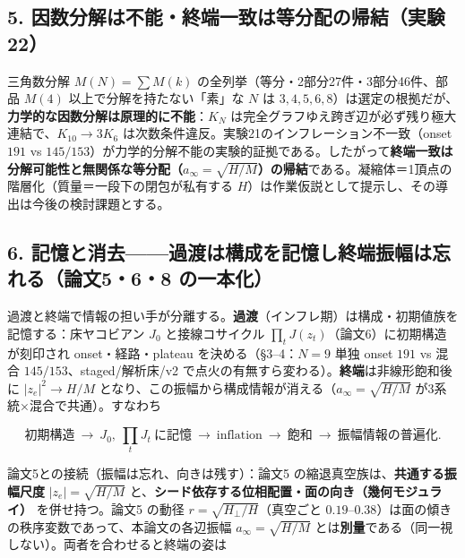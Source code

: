 \documentclass[
  a4paper,
]{ltjsarticle}
\begin{document}
\subsection{5.
因数分解は不能・終端一致は等分配の帰結（実験22）}\label{ux56e0ux6570ux5206ux89e3ux306fux4e0dux80fdux7d42ux7aefux4e00ux81f4ux306fux7b49ux5206ux914dux306eux5e30ux7d50ux5b9fux9a1322}

三角数分解 \(M(N)=\sum M(k)\) の全列挙（等分・2部分27件・3部分46件、部品
\(M(4)\) 以上で分解を持たない「素」な \(N\) は
\(3,4,5,6,8\)）は選定の根拠だが、\textbf{力学的な因数分解は原理的に不能}：\(K_N\)
は完全グラフゆえ跨ぎ辺が必ず残り極大連結で、\(K_{10}\to3K_6\)
は次数条件違反。実験21のインフレーション不一致（onset \(191\) vs
\(145/153\)）が力学的分解不能の実験的証拠である。したがって\textbf{終端一致は分解可能性と無関係な等分配（\(a_\infty=\sqrt{H/M}\)）の帰結}である。凝縮体＝1頂点の階層化（質量＝一段下の閉包が私有する
\(H\)）は作業仮説として提示し、その導出は今後の検討課題とする。

\subsection{6.
記憶と消去------過渡は構成を記憶し終端振幅は忘れる（論文5・6・8
の一本化）}\label{ux8a18ux61b6ux3068ux6d88ux53bbux904eux6e21ux306fux69cbux6210ux3092ux8a18ux61b6ux3057ux7d42ux7aefux632fux5e45ux306fux5fd8ux308cux308bux8ad6ux6587568-ux306eux4e00ux672cux5316}

過渡と終端で情報の担い手が分離する。\textbf{過渡}（インフレ期）は構成・初期値族を記憶する：床ヤコビアン
\(J_0\) と接線コサイクル \(\prod_t J(z_t)\)（論文6）に初期構造が刻印され
onset・経路・plateau を決める（§3--4：\(N=9\) 単独 onset \(191\) vs 混合
\(145/153\)、staged/解析床/v2
で点火の有無すら変わる）。\textbf{終端}は非線形飽和後に
\(|z_e|^2\to H/M\)
となり、この振幅から構成情報が消える（\(a_\infty=\sqrt{H/M}\)
が3系統×混合で共通）。すなわち

\[\text{初期構造}\ \to\ J_0,\ \textstyle\prod_t J_t\ \text{に記憶}\ \to\ \text{inflation}\ \to\ \text{飽和}\ \to\ \text{振幅情報の普遍化}.\]

論文5との接続（振幅は忘れ、向きは残す）：論文5
の縮退真空族は、\textbf{共通する振幅尺度} \(|z_e|=\sqrt{H/M}\)
と、\textbf{シード依存する位相配置・面の向き（幾何モジュライ）}
を併せ持つ。論文5 の動径 \(r=\sqrt{H_\perp/H}\)（真空ごと
\(0.19\)--\(0.38\)）は面の傾きの秩序変数であって、本論文の各辺振幅
\(a_\infty=\sqrt{H/M}\)
とは\textbf{別量}である（同一視しない）。両者を合わせると終端の姿は
\end{document}
